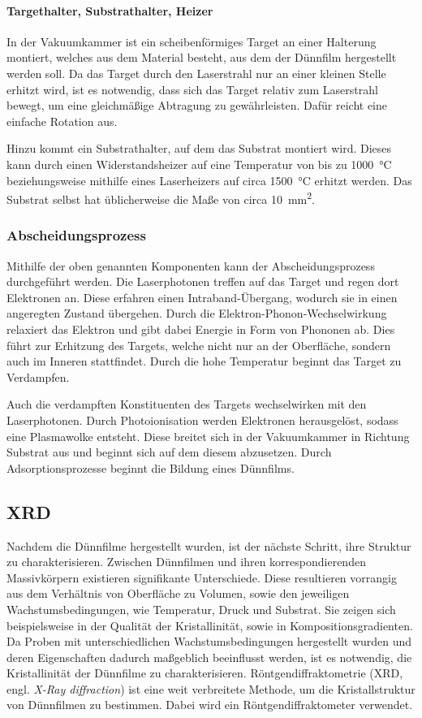 \paragraph{Targethalter, Substrathalter, Heizer}
In der Vakuumkammer ist ein scheibenförmiges Target an einer Halterung montiert, welches aus dem Material besteht, aus
dem der Dünnfilm hergestellt werden soll.
Da das Target durch den Laserstrahl nur an einer kleinen Stelle erhitzt wird, ist es notwendig,
dass sich das Target relativ zum Laserstrahl bewegt, um eine gleichmäßige Abtragung zu gewährleisten.
Dafür reicht eine einfache Rotation aus.

Hinzu kommt ein Substrathalter, auf dem das Substrat montiert wird.
Dieses kann durch einen Widerstandsheizer auf eine Temperatur von bis zu \qty{1000}{\celsius} beziehungsweise
mithilfe eines Laserheizers auf circa \qty{1500}{\celsius} erhitzt werden.
Das Substrat selbst hat üblicherweise die Maße von circa \qty{10}{\milli\meter\squared}.\autocite[2299]{pld}

\subsubsection{Abscheidungsprozess}
Mithilfe der oben genannten Komponenten kann der Abscheidungsprozess durchgeführt werden.
Die Laserphotonen treffen auf das Target und regen dort Elektronen an.
Diese erfahren einen Intraband-Übergang, wodurch sie in einen angeregten Zustand übergehen.
Durch die Elektron-Phonon-Wechselwirkung relaxiert das Elektron und gibt dabei Energie in Form von Phononen ab.
Dies führt zur Erhitzung des Targets, welche nicht nur an der Oberfläche, sondern auch im Inneren stattfindet.
Durch die hohe Temperatur beginnt das Target zu Verdampfen.

Auch die verdampften Konstituenten des Targets wechselwirken mit den Laserphotonen.
Durch Photoionisation werden Elektronen herausgelöst, sodass eine Plasmawolke entsteht.
Diese breitet sich in der Vakuumkammer in Richtung Substrat aus und beginnt sich auf dem diesem abzusetzen.
Durch Adsorptionsprozesse beginnt die Bildung eines Dünnfilms.\autocite[2299-2301]{pld}


\subsection{XRD}\label{subsec:xrd}
Nachdem die Dünnfilme hergestellt wurden, ist der nächste Schritt, ihre Struktur zu charakterisieren.
Zwischen Dünnfilmen und ihren korrespondierenden Massivkörpern existieren signifikante Unterschiede.
Diese resultieren vorrangig aus dem Verhältnis von Oberfläche zu Volumen, sowie den jeweiligen
Wachstumsbedingungen, wie Temperatur, Druck und Substrat.
Sie zeigen sich beispielsweise in der Qualität der Kristallinität, sowie in Kompositionsgradienten.
Da Proben mit unterschiedlichen Wachstumsbedingungen hergestellt wurden und deren Eigenschaften dadurch
maßgeblich beeinflusst werden, ist es notwendig, die Kristallinität der Dünnfilme zu charakterisieren.
Röntgendiffraktometrie (XRD, engl. \textit{X-Ray diffraction}) ist eine weit verbreitete Methode, um die
Kristallstruktur von Dünnfilmen zu bestimmen.
Dabei wird ein Röntgendiffraktometer verwendet.

